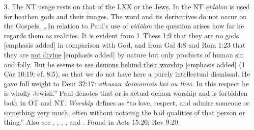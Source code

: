 3. The NT usage rests on that of the LXX or the Jews. In the NT \emph{eidōlon} is used for heathen gods and their images. The word and its derivatives do not occur on the Gospels. \ldots In relation to Paul's use of \emph{eidōlon} the question arises how far he regards them as realities. It is evident from 1~Thess 1:9 that they are \underline{no gods} [emphasis added] in comparison with God, and from Gal 4:8 and Rom 1:23 that they are \underline{not divine} [emphasis added] by nature but only products of human sin and folly. But he seems to \underline{see demons behind their worship} [emphasis added] (1 Cor 10:19; cf. 8:5), so that we do not have here a purely intellectual dismissal. He gave full weight to Deut 32:17: \emph{ethusan daimoniois kai ou theō}. In this respect he is wholly Jewish.''
 Paul denotes that  or  is actual demon worship and is forbidden both in OT and NT. \emph{Worship} defines as ``to love, respect, and admire someone or something very much, often without noticing the bad qualities of that person or thing.'' Also see , , , , and .
Found in Acts 15:20; Rev 9:20.
